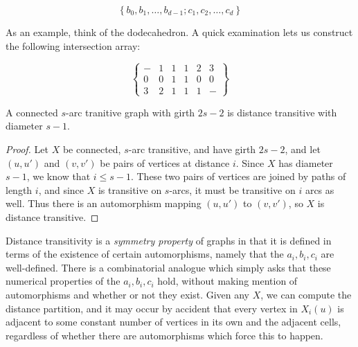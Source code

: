 $$\left\{  b_0,b_1,\dots,b_{d-1};c_1,c_2,\dots,c_d    \right\}$$

As an example, think of the dodecahedron.  A quick examination lets us construct the following intersection array:

$$\begin{Bmatrix}
-&1&1&1&2&3\\
0&0&1&1&0&0\\
3&2&1&1&1&-
\end{Bmatrix}$$

\begin{lemma}
	A connected $s$-arc tranitive graph with girth $2s-2$ is distance transitive with diameter $s-1$.
\end{lemma}

\begin{proof}
	
	Let $X$ be connected, $s$-arc transitive, and have girth $2s-2$, and let $(u,u')$ and $(v,v')$ be pairs of vertices at distance $i$.  Since $X$ has diameter $s-1$, we know that $i\leq s-1$.  These two pairs of vertices are joined by paths of length $i$, and since $X$ is transitive on $s$-arcs, it must be transitive on $i$ arcs as well.  Thus there is an automorphism mapping $(u,u')$ to $(v,v')$, so $X$ is distance transitive.
	
	
	
\end{proof}






Distance transitivity is a \textit{symmetry property} of graphs in that it is defined in terms of the existence of certain automorphisms, namely that the $a_i,b_i,c_i$ are well-defined.  There is a combinatorial analogue which simply asks that these numerical properties of the $a_i,b_i,c_i$ hold, without making mention of automorphisms and whether or not they exist.  Given any $X$, we can compute the distance partition, and it may occur by accident that every vertex in $X_i(u)$ is adjacent to some constant number of vertices in its own and the adjacent cells, regardless of whether there are automorphisms which force this to happen.  

